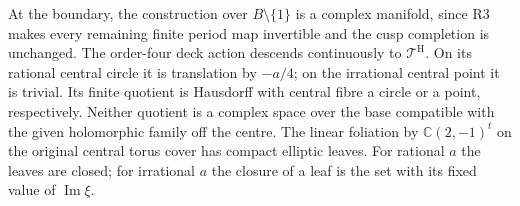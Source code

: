 \begin{proposition}[D.2.4; Proved]
At the boundary, the construction over \(B\setminus\{1\}\) is a
complex manifold, since R3 makes every remaining finite period map
invertible and the cusp completion is unchanged.
The order-four deck action descends continuously to
\(\mathcal T^{\mathrm H}\). On its rational central circle it is
translation by \(-a/4\); on the irrational central point it is
trivial. Its finite quotient is Hausdorff with central fibre a circle
or a point, respectively. Neither quotient is a complex space over
the base compatible with the given holomorphic family off the centre.
The linear foliation by \(\mathbb C(2,-1)^t\) on the original central
torus cover has compact elliptic leaves. For rational \(a\) the
leaves are closed; for irrational \(a\) the closure of a leaf is the
set with its fixed value of \(\operatorname{Im}\xi\).
\end{proposition}

